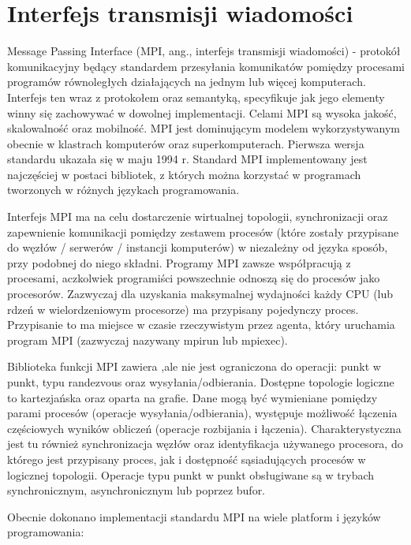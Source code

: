 \documentclass[10pt,a4paper,titlepage,twoside]{report}
\begin{document}
\section{Interfejs transmisji wiadomości}

\indent \indent Message Passing Interface (MPI, ang., interfejs transmisji wiadomości) \cite{ad26} - protokół komunikacyjny będący standardem przesyłania komunikatów pomiędzy procesami programów równoległych działających na jednym lub więcej komputerach. Interfejs ten wraz z protokołem oraz semantyką, specyfikuje jak jego elementy winny się zachowywać w dowolnej implementacji. Celami MPI są wysoka jakość, skalowalność oraz mobilność. MPI jest dominującym modelem wykorzystywanym obecnie w klastrach komputerów oraz superkomputerach. Pierwsza wersja standardu ukazała się w maju 1994 r. Standard MPI implementowany jest najczęściej w postaci bibliotek, z których można korzystać w programach tworzonych w różnych językach programowania.

Interfejs MPI ma na celu dostarczenie wirtualnej topologii, synchronizacji oraz zapewnienie komunikacji pomiędzy zestawem procesów (które zostały przypisane do węzłów / serwerów / instancji komputerów) w niezależny od języka sposób, przy podobnej do niego składni. Programy MPI zawsze współpracują z procesami, aczkolwiek programiści powszechnie odnoszą się do procesów jako procesorów. Zazwyczaj dla uzyskania maksymalnej wydajności każdy CPU (lub rdzeń w wielordzeniowym procesorze) ma przypisany pojedynczy proces. Przypisanie to ma miejsce w czasie rzeczywistym przez agenta, który uruchamia program MPI (zazwyczaj nazywany mpirun lub mpiexec).

Biblioteka funkcji MPI zawiera ,ale nie jest ograniczona do operacji: punkt w punkt, typu randezvous oraz wysyłania/odbierania. Dostępne topologie logiczne to kartezjańska oraz oparta na grafie. Dane mogą być wymieniane pomiędzy parami procesów (operacje wysyłania/odbierania), występuje możliwość łączenia częściowych wyników obliczeń (operacje rozbijania i łączenia). Charakterystyczna jest tu również synchronizacja węzłów oraz identyfikacja używanego procesora, do którego jest przypisany proces, jak i dostępność sąsiadujących procesów w logicznej topologii. Operacje typu punkt w punkt obsługiwane są w trybach synchronicznym, asynchronicznym lub poprzez bufor.

Obecnie dokonano implementacji standardu MPI na wiele platform i języków programowania:
\end{document}
